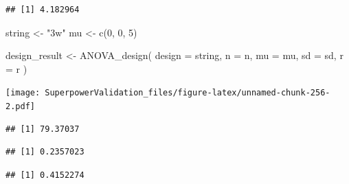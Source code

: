 \documentclass[
]{book}
\newenvironment{Shaded}{\begin{snugshade}}{\end{snugshade}}
\newcommand{\AttributeTok}[1]{\textcolor[rgb]{0.77,0.63,0.00}{#1}}
\newcommand{\DecValTok}[1]{\textcolor[rgb]{0.00,0.00,0.81}{#1}}
\newcommand{\FunctionTok}[1]{\textcolor[rgb]{0.00,0.00,0.00}{#1}}
\newcommand{\NormalTok}[1]{#1}
\newcommand{\OtherTok}[1]{\textcolor[rgb]{0.56,0.35,0.01}{#1}}
\newcommand{\SpecialCharTok}[1]{\textcolor[rgb]{0.00,0.00,0.00}{#1}}
\newcommand{\StringTok}[1]{\textcolor[rgb]{0.31,0.60,0.02}{#1}}
\begin{document}
\begin{verbatim}
## [1] 4.182964
\end{verbatim}

\begin{Shaded}
\begin{Highlighting}[]
\NormalTok{string }\OtherTok{\textless{}{-}} \StringTok{"3w"}
\NormalTok{mu }\OtherTok{\textless{}{-}} \FunctionTok{c}\NormalTok{(}\DecValTok{0}\NormalTok{, }\DecValTok{0}\NormalTok{, }\DecValTok{5}\NormalTok{)}

\NormalTok{design\_result }\OtherTok{\textless{}{-}} \FunctionTok{ANOVA\_design}\NormalTok{(}
  \AttributeTok{design =}\NormalTok{ string,}
  \AttributeTok{n =}\NormalTok{ n,}
  \AttributeTok{mu =}\NormalTok{ mu,}
  \AttributeTok{sd =}\NormalTok{ sd,}
  \AttributeTok{r =}\NormalTok{ r}
\NormalTok{)}
\end{Highlighting}
\end{Shaded}

\texttt{[image: SuperpowerValidation\_files/figure-latex/unnamed-chunk-256-2.pdf]}

\begin{Shaded}
\end{Shaded}

\begin{verbatim}
## [1] 79.37037
\end{verbatim}

\begin{Shaded}
\end{Shaded}

\begin{verbatim}
## [1] 0.2357023
\end{verbatim}

\begin{Shaded}
\end{Shaded}

\begin{verbatim}
## [1] 0.4152274
\end{verbatim}
\end{document}
